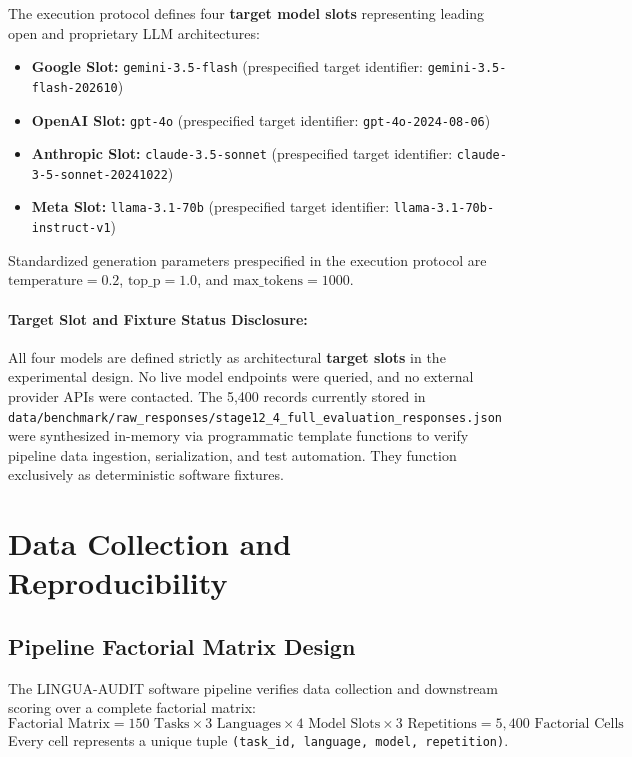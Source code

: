\documentclass[11pt,a4paper]{article}
\begin{document}
The execution protocol defines four \textbf{target model slots} representing leading open and proprietary LLM architectures:
\begin{itemize}
  \item \textbf{Google Slot:} \texttt{gemini-3.5-flash} (prespecified target identifier: \texttt{gemini-3.5-flash-202610})
  \item \textbf{OpenAI Slot:} \texttt{gpt-4o} (prespecified target identifier: \texttt{gpt-4o-2024-08-06})
  \item \textbf{Anthropic Slot:} \texttt{claude-3.5-sonnet} (prespecified target identifier: \texttt{claude-3-5-sonnet-20241022})
  \item \textbf{Meta Slot:} \texttt{llama-3.1-70b} (prespecified target identifier: \texttt{llama-3.1-70b-instruct-v1})
\end{itemize}

Standardized generation parameters prespecified in the execution protocol are $\text{temperature} = 0.2$, $\text{top\_p} = 1.0$, and $\text{max\_tokens} = 1000$.

\paragraph{Target Slot and Fixture Status Disclosure:} All four models are defined strictly as architectural \textbf{target slots} in the experimental design. No live model endpoints were queried, and no external provider APIs were contacted. The 5,400 records currently stored in \texttt{data/benchmark/raw\_responses/stage12\_4\_full\_evaluation\_responses.json} were synthesized in-memory via programmatic template functions to verify pipeline data ingestion, serialization, and test automation. They function exclusively as deterministic software fixtures.

\section{Data Collection and Reproducibility}
\label{sec:data_collection}

\subsection{Pipeline Factorial Matrix Design}
\label{sec:matrix_design}

The LINGUA-AUDIT software pipeline verifies data collection and downstream scoring over a complete factorial matrix:
\begin{equation}
\label{eq:factorial}
\text{Factorial Matrix} = 150 \text{ Tasks} \times 3 \text{ Languages} \times 4 \text{ Model Slots} \times 3 \text{ Repetitions} = 5{,}400 \text{ Factorial Cells}
\end{equation}
Every cell represents a unique tuple \texttt{(task\_id, language, model, repetition)}.
\end{document}
